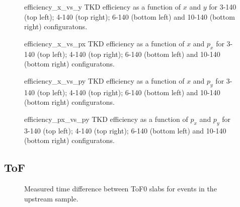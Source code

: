 \begin{figure}[!tbh]
                     {efficiency_x_vs_y}
            {TKD efficiency as a function of $x$ and $y$ for 3-140 (top left);
             4-140 (top right); 6-140 (bottom left) and 10-140 (bottom right)
             configuratons.
             \label{fig:inefficiency_xy_tkd}}
\end{figure}

\begin{figure}[!tbh]
                     {efficiency_x_vs_px}
            {TKD efficiency as a function of $x$ and $p_x$ for 3-140 (top left);
             4-140 (top right); 6-140 (bottom left) and 10-140 (bottom right)
             configuratons.
             \label{fig:inefficiency_xpx_tkd}}
\end{figure}

\begin{figure}[!tbh]
                     {efficiency_x_vs_py}
            {TKD efficiency as a function of $x$ and $p_y$ for 3-140 (top left);
             4-140 (top right); 6-140 (bottom left) and 10-140 (bottom right)
             configuratons.
             \label{fig:inefficiency_xpy_tkd}}
\end{figure}

\begin{figure}[!tbh]
                     {efficiency_px_vs_py}
            {TKD efficiency as a function of $p_x$ and $p_y$ for 3-140 (top left);
             4-140 (top right); 6-140 (bottom left) and 10-140 (bottom right)
             configuratons.
             \label{fig:inefficiency_pxpy_tkd}}
\end{figure}

\clearpage

\subsection{ToF}

\label{sec:tof_recon}

\begin{figure}[!tbh]
    \centering
    {Measured time difference between ToF0 slabs for events in the upstream sample.}
\end{figure}

